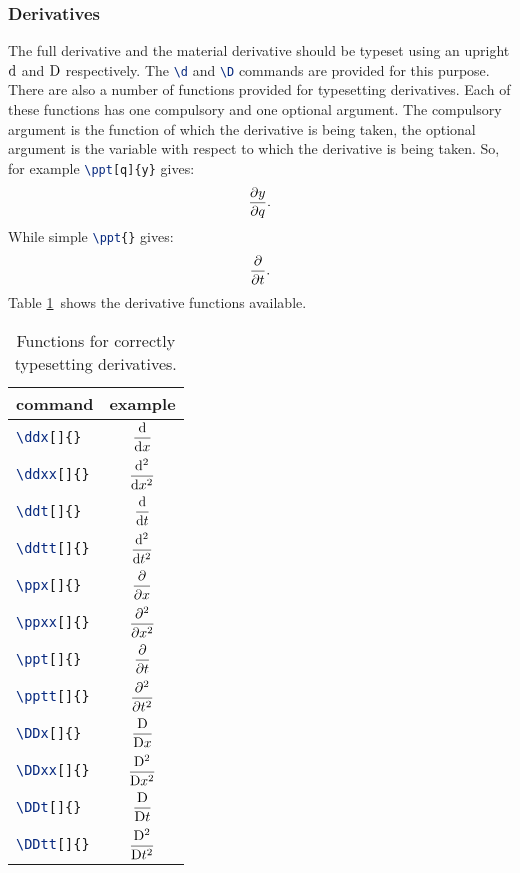 \subsubsection{Derivatives}

The full derivative and the material derivative should be typeset using an
upright $\d$ and $\D$ respectively. The \lstinline[language=TeX]+\d+ and
\lstinline[language=TeX]+\D+ commands are provided for this purpose. There
are also a number of functions provided for typesetting derivatives. Each of
these functions has one compulsory and one optional argument. The
compulsory argument is the function of which the derivative is being taken,
the optional argument is the variable with respect to which the derivative
is being taken. So, for example \lstinline[language=TeX]+\ppt[q]{y}+ gives:
\begin{equation*}
  \ppt[q]{y}.
\end{equation*}
While simple \lstinline[language=TeX]+\ppt{}+ gives:
\begin{equation*}
  \ppt{}.
\end{equation*}
Table \ref{tab:derivatives}\ shows the derivative functions available.
\begin{table}[ht]
  \centering
  \begin{tabular}{lc}
    \textbf{command} & \textbf{example}\\\hline
    \lstinline[language=TeX]+\ddx[]{}+ & \rule{0pt}{4ex}$\displaystyle\ddx{}$\\
    \lstinline[language=TeX]+\ddxx[]{}+ & \rule{0pt}{4ex}$\displaystyle\ddxx{}$\\
    \lstinline[language=TeX]+\ddt[]{}+ & \rule{0pt}{4ex}$\displaystyle\ddt{}$\\
    \lstinline[language=TeX]+\ddtt[]{}+ & \rule{0pt}{4ex}$\displaystyle\ddtt{}$\\
    \lstinline[language=TeX]+\ppx[]{}+ & \rule{0pt}{4ex}$\displaystyle\ppx{}$\\
    \lstinline[language=TeX]+\ppxx[]{}+ & \rule{0pt}{4ex}$\displaystyle\ppxx{}$\\
    \lstinline[language=TeX]+\ppt[]{}+ & \rule{0pt}{4ex}$\displaystyle\ppt{}$\\
    \lstinline[language=TeX]+\pptt[]{}+ & \rule{0pt}{4ex}$\displaystyle\pptt{}$\\
    \lstinline[language=TeX]+\DDx[]{}+ & \rule{0pt}{4ex}$\displaystyle\DDx{}$\\
    \lstinline[language=TeX]+\DDxx[]{}+ & \rule{0pt}{4ex}$\displaystyle\DDxx{}$\\
    \lstinline[language=TeX]+\DDt[]{}+ & \rule{0pt}{4ex}$\displaystyle\DDt{}$\\
    \lstinline[language=TeX]+\DDtt[]{}+ & \rule{0pt}{4ex}$\displaystyle\DDtt{}$\\ 
  \end{tabular}
  \caption{Functions for correctly typesetting derivatives.}
  \label{tab:derivatives}
\end{table}

